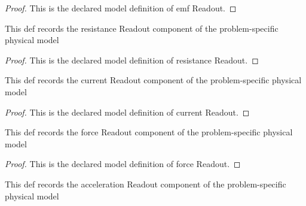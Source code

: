 \begin{proof}
  This is the declared model definition of emf Readout.
\end{proof}
\begin{definition}
  \label{def:physics:phyx-mini-0976:phyxminiproblems-problemphyxmini0976-resistancereadout}
  This def records the resistance Readout component of the problem-specific physical model
\end{definition}
\begin{proof}
  This is the declared model definition of resistance Readout.
\end{proof}
\begin{definition}
  \label{def:physics:phyx-mini-0976:phyxminiproblems-problemphyxmini0976-currentreadout}
  This def records the current Readout component of the problem-specific physical model
\end{definition}
\begin{proof}
  This is the declared model definition of current Readout.
\end{proof}
\begin{definition}
  \label{def:physics:phyx-mini-0976:phyxminiproblems-problemphyxmini0976-forcereadout}
  This def records the force Readout component of the problem-specific physical model
\end{definition}
\begin{proof}
  This is the declared model definition of force Readout.
\end{proof}
\begin{definition}
  \label{def:physics:phyx-mini-0976:phyxminiproblems-problemphyxmini0976-accelerationreadout}
  This def records the acceleration Readout component of the problem-specific physical model
\end{definition}
